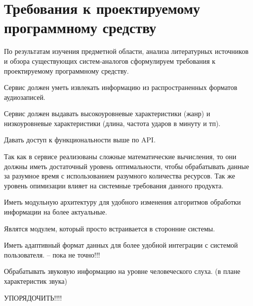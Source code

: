 \section{Требования к проектируемому программному средству}
\label{sec:specification}

По результатам изучения предметной области, анализа литературных источников и обзора существующих систем-аналогов сформулируем требования к проектируемому программному средству.

Сервис должен уметь извлекать информацию из распространенных форматов аудиозаписей.

Сервис должен выдавать высокоуровневые характеристики (жанр) и низкоуровневые характеристики (длина, частота ударов в минуту и тп).

Давать доступ к функциональности выше по API.

Так как в сервисе реализованы сложные математические вычисления, то они должны иметь достаточный уровень оптимальности, чтобы обрабатывать данные за разумное время с использованием разумного количества ресурсов. Так же уровень опимизации влияет на системные требования данного продукта.

Иметь модульную архитектуру для удобного изменения алгоритмов обработки информации на более актуальные.

Являтся модулем, который просто встраивается в сторонние системы.

Иметь адаптивный формат данных для более удобной интеграции с системой пользователя. -- пока не точно!!!

Обрабатывать звуковую информацию на уровне человеческого слуха. (в плане характеристик звука)

УПОРЯДОЧИТЬ!!!!
